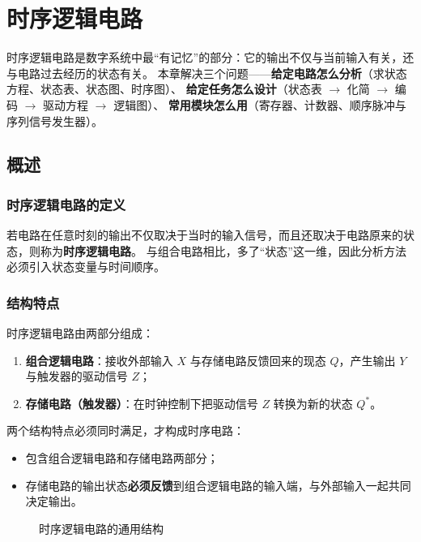 \setlength{\parskip}{0.4em}
\setlength{\itemsep}{0.2em}
\setlength{\tabcolsep}{4pt}

\chapter{时序逻辑电路}

时序逻辑电路是数字系统中最“有记忆”的部分：它的输出不仅与当前输入有关，还与电路过去经历的状态有关。
本章解决三个问题——\textbf{给定电路怎么分析}（求状态方程、状态表、状态图、时序图）、
\textbf{给定任务怎么设计}（状态表 $\rightarrow$ 化简 $\rightarrow$ 编码 $\rightarrow$ 驱动方程 $\rightarrow$ 逻辑图）、
\textbf{常用模块怎么用}（寄存器、计数器、顺序脉冲与序列信号发生器）。

\section{概述}
\subsection{时序逻辑电路的定义}
若电路在任意时刻的输出不仅取决于当时的输入信号，而且还取决于电路原来的状态，则称为\textbf{时序逻辑电路}。
与组合电路相比，多了“状态”这一维，因此分析方法必须引入状态变量与时间顺序。

\subsection{结构特点}
时序逻辑电路由两部分组成：
\begin{enumerate}
    \item \textbf{组合逻辑电路}：接收外部输入 $X$ 与存储电路反馈回来的现态 $Q$，产生输出 $Y$ 与触发器的驱动信号 $Z$；
    \item \textbf{存储电路（触发器）}：在时钟控制下把驱动信号 $Z$ 转换为新的状态 $Q^*$。
\end{enumerate}
两个结构特点必须同时满足，才构成时序电路：
\begin{itemize}
    \item 包含组合逻辑电路和存储电路两部分；
    \item 存储电路的输出状态\textbf{必须反馈}到组合逻辑电路的输入端，与外部输入一起共同决定输出。
\end{itemize}

\begin{figure}[!htbp]
\centering
{}
\caption{时序逻辑电路的通用结构}
\label{fig:seq_struct}
\end{figure}

